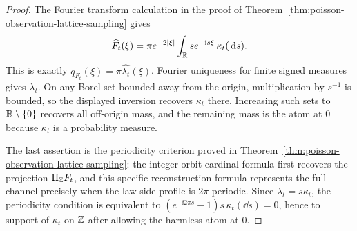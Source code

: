 \begin{proof}
The Fourier transform calculation in the proof of
Theorem~\ref{thm:poisson-observation-lattice-sampling} gives
\[
\widehat F_t(\xi)
=\pi e^{-2|\xi|}\int_{\mathbb{R}}s e^{-\mathrm{i} s\xi}\,\kappa_t(\,\mathrm{d} s).
\]
This is exactly \(q_{F_t}(\xi)=\pi\widehat{\lambda_t}(\xi)\).  Fourier
uniqueness for finite signed measures gives \(\lambda_t\).  On any Borel set
bounded away from the origin, multiplication by \(s^{-1}\) is bounded, so the
displayed inversion recovers \(\kappa_t\) there.  Increasing such sets to
\(\mathbb{R}\setminus\{0\}\) recovers all off-origin mass, and the remaining mass is
the atom at \(0\) because \(\kappa_t\) is a probability measure.

The last assertion is the periodicity criterion proved in
Theorem~\ref{thm:poisson-observation-lattice-sampling}: the integer-orbit
cardinal formula first recovers the projection \(\Pi_{\mathbb{Z}}F_t\), and this
specific reconstruction formula represents the full channel precisely when
the law-side profile is \(2\pi\)-periodic.  Since \(\lambda_t=s\kappa_t\), the
periodicity condition is equivalent to
\((e^{-\ii2\pi s}-1)s\,\kappa_t(\dd s)=0\), hence to support of \(\kappa_t\) on
\(\mathbb{Z}\) after allowing the harmless atom at \(0\).
\end{proof}


